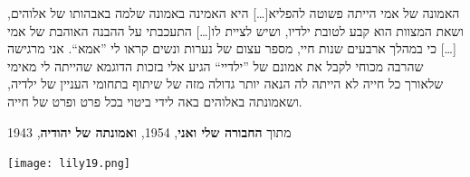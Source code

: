 \documentclass[14pt, article, extrafontsizes, twopage, a4paper]{memoir}
\newcommand{\attr}[1]{
  \vspace*{.25\baselineskip}
  {\raggedright\smaller#1


  }
}
\begin{document}
{האמונה של אמי הייתה פשוטה להפליא[…] היא האמינה באמונה שלמה באבהותו של אלוהים, ושאת המצוות הוא קבע לטובת ילדיו, ושיש לציית לו[…] התעכבתי על ההבנה האוהבת של אמי […] כי במהלך ארבעים שנות חיי, מספר עצום של נערות ונשים קראו לי ”אמא“. אני מרגישה שהרבה מכוחי לקבל את אמונם של ”ילדיי“ הגיע אלי בזכות הדוגמא שהייתה לי מאימי שלאורך כל חייה לא הייתה לה הנאה יותר גדולה מזה של שיתוף בתחומי העניין של ילדיה, ושאמונתה באלוהים באה לידי ביטוי בכל פרט ופרט של חייה.

\attr{מתוך \textbf{החבורה שלי ואני}, 1954, ו\textbf{אמונתה של יהודיה}, 1943}

{
  \centering
\vspace*{.5\baselineskip}
\texttt{[image: lily19.png]}\\

}
  }

  \clearpage
\end{document}
